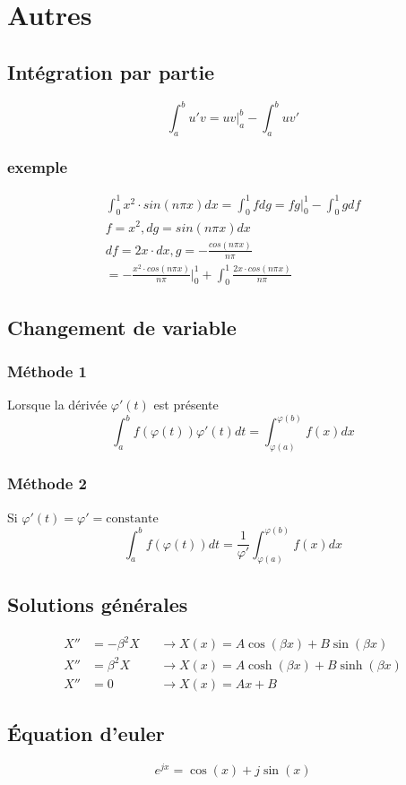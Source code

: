 \documentclass[resume]{subfiles}
\begin{document}
\section{Autres}
\label{sec_autres}
\subsection{Intégration par partie}
$$\int_{a}^{b}u'v=uv\Big|_{a}^{b}-\int_{a}^{b}uv'$$
\subsubsection{exemple}
\begin{align*}
\int_{0}^{1}x^2\cdot sin(n\pi x)dx=\int_{0}^{1} f dg = fg\Big|_{0}^{1} - \int_{0}^{1} g df \\
f=x^2, dg= sin(n\pi x)dx\\
df=2x\cdot dx, g = -\frac{cos(n\pi x)}{n\pi}\\
= -\frac{x^2\cdot cos(n\pi x)}{n\pi}\Big|_{0}^{1}+\int_{0}^{1} \frac{2x\cdot cos(n\pi x)}{n\pi}
\end{align*}

\subsection{Changement de variable}
\subsubsection{Méthode 1}
Lorsque la dérivée $\varphi'(t)$ est présente 
$$\int_{a}^{b}f(\varphi(t))\varphi'(t)dt=\int_{\varphi(a)}^{\varphi(b)}f(x)dx$$
\subsubsection{Méthode 2}
Si $\varphi'(t)=\varphi'=\text{constante}$
$$\int_{a}^{b}f(\varphi(t))dt=\frac{1}{\varphi'}\int_{\varphi(a)}^{\varphi(b)}f(x)dx$$
\subsection{Solutions générales}
\begin{align*}
X''&=-\beta^2 X&&\longrightarrow X(x)=A\cos(\beta x)+B\sin(\beta x)\\
X''&=\beta^2 X&&\longrightarrow X(x)=A\cosh(\beta x)+B\sinh(\beta x)\\
X''&=0 &&\longrightarrow X(x)=Ax+B
\end{align*}

\subsection{Équation d'euler}
$$e^{jx}=\cos(x)+j\sin(x)$$
\end{document}
